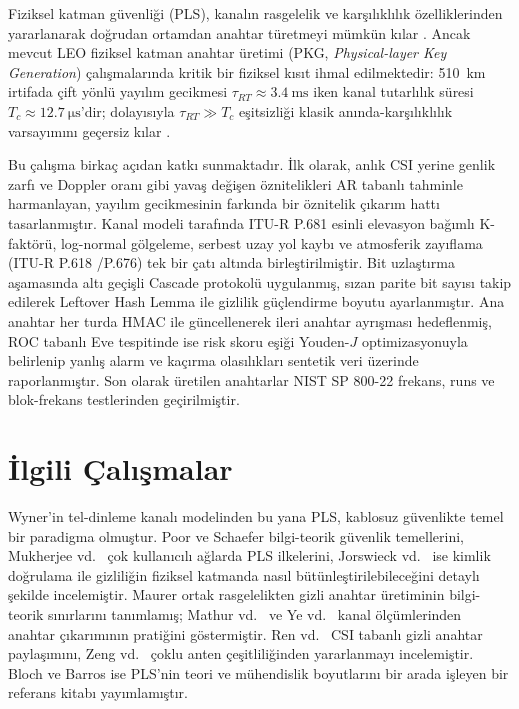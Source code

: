 \documentclass[conference,a4paper]{IEEEtran}
\begin{document}
Fiziksel katman güvenliği (PLS), kanalın rasgelelik ve karşılıklılık özelliklerinden yararlanarak doğrudan ortamdan anahtar türetmeyi mümkün kılar \cite{mathur,ye,maurer}. Ancak mevcut LEO fiziksel katman anahtar üretimi (PKG, \emph{Physical-layer Key Generation}) çalışmalarında kritik bir fiziksel kısıt ihmal edilmektedir: \SI{510}{km} irtifada çift yönlü yayılım gecikmesi $\tau_{RT} \approx \SI{3.4}{\milli\second}$ iken kanal tutarlılık süresi $T_c \approx \SI{12.7}{\micro\second}$'dir; dolayısıyla $\tau_{RT} \gg T_c$ eşitsizliği klasik anında-karşılıklılık varsayımını geçersiz kılar \cite{torshizi,topal_doppler,abdelsalam_state}.

Bu çalışma birkaç açıdan katkı sunmaktadır. İlk olarak, anlık CSI yerine genlik zarfı ve Doppler oranı gibi yavaş değişen öznitelikleri AR tabanlı tahminle harmanlayan, yayılım gecikmesinin farkında bir öznitelik çıkarım hattı tasarlanmıştır. Kanal modeli tarafında ITU-R P.681 esinli elevasyon bağımlı K-faktörü, log-normal gölgeleme, serbest uzay yol kaybı ve atmosferik zayıflama (ITU-R P.618 \cite{itur_p618}/P.676) tek bir çatı altında birleştirilmiştir. Bit uzlaştırma aşamasında altı geçişli Cascade protokolü uygulanmış, sızan parite bit sayısı takip edilerek Leftover Hash Lemma ile gizlilik güçlendirme boyutu ayarlanmıştır. Ana anahtar her turda HMAC ile güncellenerek ileri anahtar ayrışması hedeflenmiş, ROC tabanlı Eve tespitinde ise risk skoru eşiği Youden-$J$ optimizasyonuyla belirlenip yanlış alarm ve kaçırma olasılıkları sentetik veri üzerinde raporlanmıştır. Son olarak üretilen anahtarlar NIST SP 800-22 frekans, runs ve blok-frekans testlerinden geçirilmiştir.

\section{İlgili Çalışmalar}

Wyner'in tel-dinleme kanalı modelinden \cite{wyner} bu yana PLS, kablosuz güvenlikte temel bir paradigma olmuştur. Poor ve Schaefer \cite{poor_schaefer} bilgi-teorik güvenlik temellerini, Mukherjee vd.\ \cite{mukherjee} çok kullanıcılı ağlarda PLS ilkelerini, Jorswieck vd.\ \cite{jorswieck} ise kimlik doğrulama ile gizliliğin fiziksel katmanda nasıl bütünleştirilebileceğini detaylı şekilde incelemiştir. Maurer \cite{maurer} ortak rasgelelikten gizli anahtar üretiminin bilgi-teorik sınırlarını tanımlamış; Mathur vd.\ \cite{mathur} ve Ye vd.\ \cite{ye} kanal ölçümlerinden anahtar çıkarımının pratiğini göstermiştir. Ren vd.\ \cite{ren_csi} CSI tabanlı gizli anahtar paylaşımını, Zeng vd.\ \cite{zeng_multipath} çoklu anten çeşitliliğinden yararlanmayı incelemiştir. Bloch ve Barros \cite{bloch} ise PLS'nin teori ve mühendislik boyutlarını bir arada işleyen bir referans kitabı yayımlamıştır.
\end{document}
